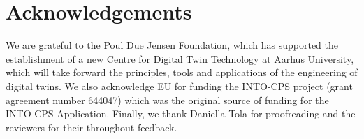 \section*{Acknowledgements}
We are grateful to the Poul Due Jensen Foundation, which has supported the establishment of a new Centre for Digital Twin Technology at Aarhus University, which will take forward the principles, tools and applications of the engineering of digital twins. We also acknowledge EU for funding the INTO-CPS project (grant agreement number 644047) which was the original source of funding for the INTO-CPS Application. Finally, we thank Daniella Tola for proofreading and the reviewers for their throughout feedback.